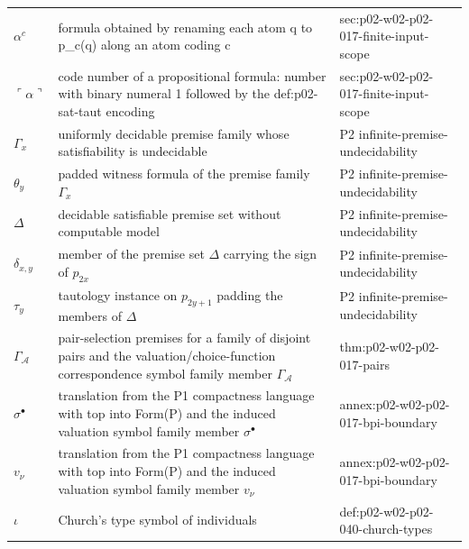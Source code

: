 \begin{longtable}{@{}p{}p{}p{}@{}}
\(\alpha^{c}\) & formula obtained by renaming each atom q to p\_{c(q)} along an atom coding c & sec:\allowbreak{}p02-\allowbreak{}w02-\allowbreak{}p02-\allowbreak{}017-\allowbreak{}finite-\allowbreak{}input-\allowbreak{}scope \\
\(\ulcorner\alpha\urcorner\) & code number of a propositional formula: number with binary numeral 1 followed by the def:p02-sat-taut encoding & sec:\allowbreak{}p02-\allowbreak{}w02-\allowbreak{}p02-\allowbreak{}017-\allowbreak{}finite-\allowbreak{}input-\allowbreak{}scope \\
\(\Gamma_x\) & uniformly decidable premise family whose satisfiability is undecidable & P2 infinite-\allowbreak{}premise-\allowbreak{}undecidability \\
\(\theta_y\) & padded witness formula of the premise family \(\Gamma_x\) & P2 infinite-\allowbreak{}premise-\allowbreak{}undecidability \\
\(\Delta\) & decidable satisfiable premise set without computable model & P2 infinite-\allowbreak{}premise-\allowbreak{}undecidability \\
\(\delta_{x,y}\) & member of the premise set \(\Delta\) carrying the sign of \(p_{2x}\) & P2 infinite-\allowbreak{}premise-\allowbreak{}undecidability \\
\(\tau_y\) & tautology instance on \(p_{2y+1}\) padding the members of \(\Delta\) & P2 infinite-\allowbreak{}premise-\allowbreak{}undecidability \\
\(\Gamma_{\mathcal A}\) & pair-selection premises for a family of disjoint pairs and the valuation/choice-function correspondence symbol family member \(\Gamma_{\mathcal A}\) & thm:\allowbreak{}p02-\allowbreak{}w02-\allowbreak{}p02-\allowbreak{}017-\allowbreak{}pairs \\
\(\sigma^{\bullet}\) & translation from the P1 compactness language with top into Form(P) and the induced valuation symbol family member \(\sigma^{\bullet}\) & annex:\allowbreak{}p02-\allowbreak{}w02-\allowbreak{}p02-\allowbreak{}017-\allowbreak{}bpi-\allowbreak{}boundary \\
\(v_\nu\) & translation from the P1 compactness language with top into Form(P) and the induced valuation symbol family member \(v_\nu\) & annex:\allowbreak{}p02-\allowbreak{}w02-\allowbreak{}p02-\allowbreak{}017-\allowbreak{}bpi-\allowbreak{}boundary \\
\(\iota\) & Church's type symbol of individuals & def:\allowbreak{}p02-\allowbreak{}w02-\allowbreak{}p02-\allowbreak{}040-\allowbreak{}church-\allowbreak{}types \\

\end{longtable}
